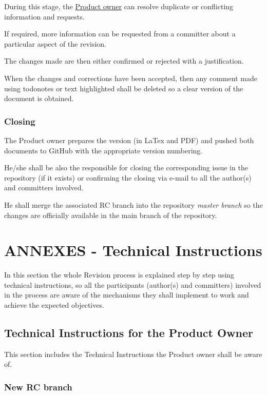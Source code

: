 \documentclass{template/openetcs_article}
\begin{document}
During this stage, the \underline{Product owner} can resolve duplicate or
conflicting information and requests.

If required, more information can be requested from a committer about a
particular aspect of the revision. 

The changes made are then either confirmed or rejected with a justification.

When the changes and corrections have been accepted, then any comment made using todonotes or text highlighted shall be deleted so a clear version of the document is obtained.

\subsubsection{Closing}

The Product owner prepares the version (in LaTex and PDF) and pushed both documents to GitHub with the appropriate version numbering. 

He/she shall be also the responsible for closing the corresponding issue in the repository (if it exists) or confirming the closing via e-mail to all the author(s) and committers involved. 

He shall merge the associated RC branch into the repository {\it master branch} so the changes are officially available in the main branch of the repository.


\section{ANNEXES - Technical Instructions}

In this section the whole Revision process is explained step by step using technical instructions, so all the participants (author(s) and committers) involved in the process are aware of the mechanisms they shall implement to work and achieve the expected objectives. 

\subsection{Technical Instructions for the Product Owner}

This section includes the Technical Instructions the Product owner shall be aware of.

\subsubsection{New RC branch}
\end{document}
